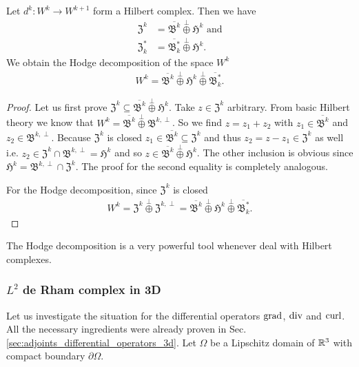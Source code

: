 \documentclass[../main.tex]{subfiles}
\begin{document}
\begin{theorem}\label{thm:hodge_decomposition}
    Let $d^k: W^k \rightarrow W^{k+1}$ form a Hilbert complex. 
    Then we have
    \begin{align*}
        \mathfrak{Z}^k &= \overline{\mathfrak{B}^k} \stackrel{\perp}{\oplus}
            \mathfrak{H}^k \text{ and}
        \\ \mathfrak{Z}^*_k &= 
            \overline{\mathfrak{B}^*_k} \stackrel{\perp}{\oplus}
            \mathfrak{H}^k.
    \end{align*}
    We obtain the Hodge decomposition of the space $W^k$
    \begin{align*}
        W^k = \overline{\mathfrak{B}^k} \stackrel{\perp}{\oplus}
            \mathfrak{H}^k \stackrel{\perp}{\oplus} \overline{\mathfrak{B}^*_k}.
    \end{align*}
\end{theorem}
\begin{proof}
    Let us first prove $\mathfrak{Z}^k \subseteq 
    \overline{\mathfrak{B}^k} \stackrel{\perp}{\oplus} \mathfrak{H}^k$.
    Take $z \in \mathfrak{Z}^k$ arbitrary. 
    From basic Hilbert theory we know that 
    $W^k = \overline{\mathfrak{B}^k} \stackrel{\perp}{\oplus} 
    \mathfrak{B}^{k,\perp}$. So we find $z = z_1 + z_2$ with
    $z_1 \in \overline{\mathfrak{B}^k}$ and $z_2 \in 
    \mathfrak{B}^{k,\perp}$. 
    Because $\mathfrak{Z}^k$ is closed 
    $z_1 \in \overline{\mathfrak{B}^k} \subseteq \mathfrak{Z}^k$ 
    and thus $z_2 = z - z_1 \in \mathfrak{Z}^k$ as well i.e. $z_2 \in \mathfrak{Z}^k 
    \cap \mathfrak{B}^{k,\perp} = \mathfrak{H}^k$ and so 
    $z \in \overline{\mathfrak{B}^k} \stackrel{\perp}{\oplus}
    \mathfrak{H}^k$. The other inclusion is obvious since 
    $\mathfrak{H}^k = \mathfrak{B}^{k,\perp} \cap \mathfrak{Z}^k$.
    The proof for the second equality is completely analogous. 

    For the Hodge decomposition, since $\mathfrak{Z}^k$ is closed 
    \begin{align*}
        W^k = \mathfrak{Z}^k \stackrel{\perp}{\oplus} \mathfrak{Z}^{k,\perp}
        =  \overline{\mathfrak{B}^k} \stackrel{\perp}{\oplus}
            \mathfrak{H}^k \stackrel{\perp}{\oplus} \overline{\mathfrak{B}^*_k}.
    \end{align*}
\end{proof}
The Hodge decomposition is a very powerful tool whenever deal with Hilbert
complexes.

\subsubsection{$L^2$ de Rham complex in 3D} \label{sec:l2_de_rham_complex_in_3d}
Let us investigate the situation for the differential operators 
$\operatorname{grad}$, $\operatorname{div}$ and $\operatorname{curl}$. All the necessary ingredients were already 
proven in Sec.\,\ref{sec:adjoints_differential_operators_3d}. 
Let $\Omega$ be a Lipschitz domain of 
$\mathbb{R}^3$ with compact boundary $\partial \Omega$. %
\end{document}
